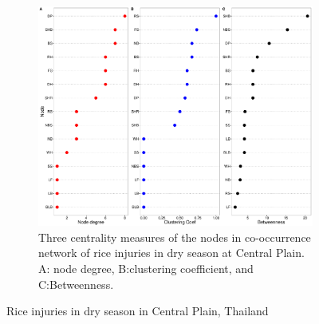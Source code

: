 \begin{figure}
\begin{subfigure}[b]{1\textwidth}
        \includegraphics[width = 1\textwidth]{figures/yield_dif_nodepropCentral_Plain.pdf}
        \caption{Three centrality measures of the nodes in co-occurrence network of rice injuries in dry season at Central Plain. A: node degree, B:clustering coefficient, and C:Betweenness.}
        \label{fig:nodepropCP_ds}
    \end{subfigure}
    \caption{Rice injuries in dry season in Central Plain, Thailand}
    \label{fig:CP_ds}
\end{figure}
 
